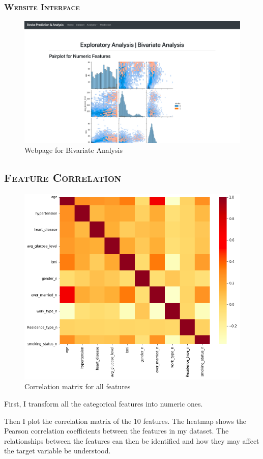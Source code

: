 \documentclass[a4paper,12pt]{article}
\begin{document}
\newpage
\subsubsection{\textsc{Website Interface}}
\begin{figure}[h] 
    \centering
    \includegraphics[width=1\textwidth]{ba} 
    \caption{Webpage for Bivariate Analysis} 
\end{figure}

\subsection{\textsc{Feature Correlation}}
\begin{figure}[h] 
    \centering
    \includegraphics[width=.5\textwidth]{corr_p1} 
    \caption{Correlation matrix for all features} 
\end{figure}

First, I transform all the categorical features into numeric ones.

Then I plot the correlation matrix of the 10 features. The heatmap shows the Pearson correlation coefficients between the features in my dataset. The relationships between the features can then be identified and how they may affect the target variable be understood.
\end{document}
